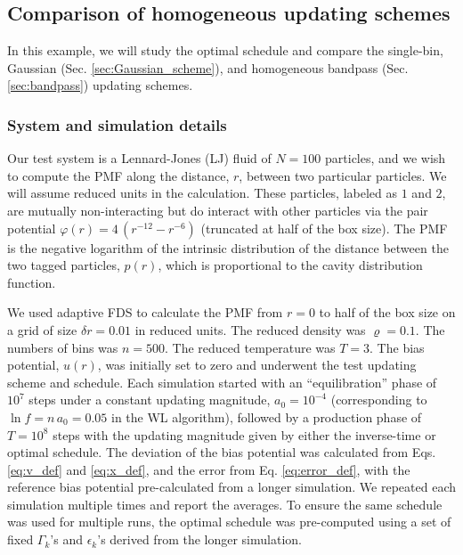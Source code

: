 \documentclass[reprint, superscriptaddress, floatfix]{revtex4-1}
\begin{document}
\subsection{\label{sec:lj}
Comparison of homogeneous updating schemes}

In this example, we will study the optimal schedule
and compare the single-bin,
Gaussian (Sec. \ref{sec:Gaussian_scheme}),
and homogeneous bandpass (Sec. \ref{sec:bandpass})
updating schemes.

\subsubsection{System and simulation details}

Our test system is
a Lennard-Jones (LJ) fluid of $N = 100$ particles,
and we wish to compute the PMF along
the distance, $r$, between two particular particles.
%
We will assume reduced units in the calculation.
%
These particles, labeled as $1$ and $2$,
are mutually non-interacting
but do interact with other particles
via the pair potential $\varphi(r) = 4 \, \left(r^{-12} - r^{-6}\right)$
(truncated at half of the box size).
%
The PMF is the negative logarithm of
the intrinsic distribution of the distance
between the two tagged particles, $p(r)$,
which is proportional to the cavity distribution function\cite{hansen}.
%

We used adaptive FDS to calculate
the PMF from $r = 0$ to half of the box size
on a grid of size $\delta r = 0.01$ in reduced units.
%
The reduced density was $\varrho = 0.1$.
The numbers of bins was $n = 500$.
The reduced temperature was $T = 3$.
%
The bias potential, $u(r)$,
was initially set to zero and
underwent the test updating scheme and schedule.
%
Each simulation started with an ``equilibration'' phase
of $10^7$ steps under a constant updating magnitude,
$a_0 = 10^{-4}$
(corresponding to $\ln f = n \, a_0 = 0.05$ in the WL algorithm),
followed by a production phase of
$T = 10^8$ steps
with the updating magnitude given by
either the inverse-time or optimal schedule.
%
The deviation of the bias potential was calculated from
Eqs. \eqref{eq:v_def} and \eqref{eq:x_def},
and the error from Eq. \eqref{eq:error_def},
with the reference bias potential
pre-calculated from a longer simulation.
%
We repeated each simulation multiple times
and report the averages.
%
To ensure the same schedule was used for multiple runs,
the optimal schedule was pre-computed using a set of fixed
$\Gamma_k$'s and $\epsilon_k$'s derived from the longer simulation.
\end{document}
